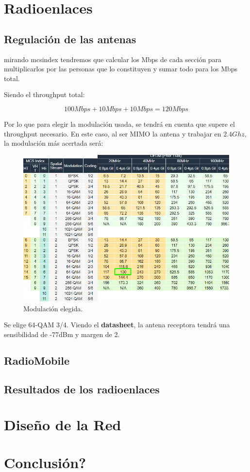 \documentclass{article}
\begin{document}
\section{Radioenlaces}

\subsection{Regulación de las antenas}

mirando mcsindex tendremos que calcular los Mbps de cada sección para multiplicarlos por las personas que lo constituyen y sumar todo para los Mbps total. 

Siendo el throughput total:

$$100Mbps + 10Mbps + 10Mbps = 120Mbps$$

Por lo que para elegir la modulación usada, se tendrá en cuenta que supere el throughput necesario. En este caso, al ser MIMO la antena y trabajar en $2.4Ghz$, la modulación más acertada será:

\begin{figure}[ht]
    \centering
    \includegraphics[width=0.8
    \linewidth]{src/chrome_GUtrJRqsad.png}
    \caption{\label{fig:mcsindex} Modulación elegida.}
\end{figure}
\newpage
Se elige 64-QAM 3/4. Viendo el \textbf{datasheet}, la antena receptora tendrá una sensibilidad de -77dBm y margen de 2.

\subsection{RadioMobile}

\subsection{Resultados de los radioenlaces}

\section{Diseño de la Red}

\section{Conclusión?}
\end{document}
